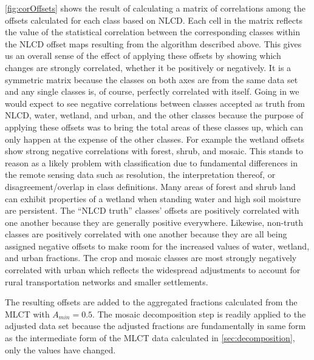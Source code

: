 \autoref{fig:corOffsets} shows the result of calculating a matrix of
correlations among the offsets calculated for each class based on
NLCD.  Each cell in the matrix reflects the value of the statistical
correlation between the corresponding classes within the NLCD offset
maps resulting from the algorithm described above.  This gives us an
overall sense of the effect of applying these offsets by showing which
changes are strongly correlated, whether it be positively or
negatively.  It is a symmetric matrix because the classes on both axes
are from the same data set and any single classes is, of course,
perfectly correlated with itself.  Going in we would expect to see
negative correlations between classes accepted as truth from NLCD,
water, wetland, and urban, and the other classes because the purpose
of applying these offsets was to bring the total areas of these
classes up, which can only happen at the expense of the other classes.
For example the wetland offsets show strong negative correlations with
forest, shrub, and mosaic.  This stands to reason as a likely problem
with classification due to fundamental differences in the remote
sensing data such as resolution, the interpretation thereof, or
disagreement/overlap in class definitions.  Many areas of forest
and shrub land can exhibit properties of a wetland when standing water
and high soil moisture are persistent.  The ``NLCD truth'' classes'
offsets are positively correlated with one another because they are
generally positive everywhere.  Likewise, non-truth classes are
positively correlated with one another because they are all being
assigned negative offsets to make room for the increased values of
water, wetland, and urban fractions.  The crop and mosaic classes are
most strongly negatively correlated with urban which reflects the
widespread adjustments to account for rural transportation networks
and smaller settlements.

The resulting offsets are added to the aggregated fractions calculated
from the MLCT with $A_{min}=0.5$.  The mosaic decomposition step is
readily applied to the adjusted data set because the adjusted
fractions are fundamentally in same form as the intermediate form of
the MLCT data calculated in \autoref{sec:decomposition}, only the
values have changed.














